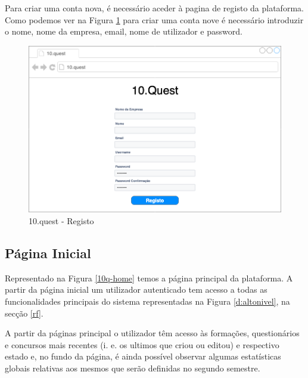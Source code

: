 Para criar uma conta nova, é necessário aceder à pagina de registo da plataforma. Como podemos ver na Figura \ref{10q-registo}  para criar uma conta nove é necessário introduzir o nome, nome da empresa, email, nome de utilizador e password.

\begin{figure}[ht!]
	\begin{center}
		\includegraphics[width=1\textwidth]{img/prototipos/2.png}
		\caption{10.quest - Registo}
		\label{10q-registo}
	\end{center}
\end{figure}



\subsection{Página Inicial}

Representado na Figura \ref{10q-home} temos a página principal da plataforma. A partir da página inicial um utilizador autenticado tem acesso a todas as funcionalidades principais do sistema representadas na Figura \ref{d:altonivel}, na secção \ref{rf}.

A partir da páginas principal o utilizador têm acesso às formações, questionários e concursos mais recentes (i. e. os ultimos que criou ou editou) e respectivo estado e, no fundo da página, é ainda possível observar algumas estatísticas globais relativas aos mesmos que serão definidas no segundo semestre.

\newpage

